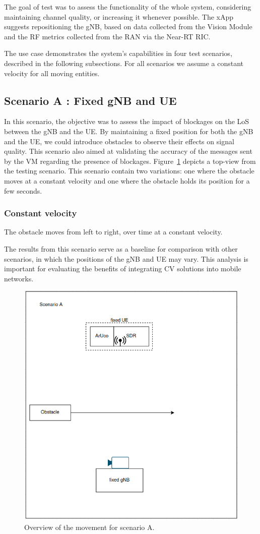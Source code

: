 The goal of test was to assess the functionality of the whole system, considering maintaining channel quality, or increasing it whenever possible.
The xApp suggests repositioning the gNB, based on data collected from the Vision Module and the RF metrics collected from the RAN via the Near-RT RIC\@.

The use case demonstrates the system's capabilities in four test scenarios, described in the following subsections.
For all scenarios we assume a constant velocity for all moving entities.

\subsection{Scenario A : Fixed gNB and UE}\label{subsec:scenario-0-:-fixed-gnb-and-ue}

In this scenario, the objective was to assess the impact of blockages on the LoS between the gNB and the UE\@.
By maintaining a fixed position for both the gNB and the UE, we could introduce obstacles to observe their effects on signal quality.
This scenario also aimed at validating the accuracy of the messages sent by the VM regarding the presence of blockages.
Figure~\ref{fig:test_fixed} depicts a top-view from the testing scenario.
This scenario contain two variations: one where the obstacle moves at a constant velocity and one where the obstacle holds its position for a few seconds.

\subsubsection{Constant velocity}
The obstacle moves from left to right, over time at a constant velocity.

The results from this scenario serve as a baseline for comparison with other scenarios, in which the positions of the gNB and UE may vary.
This analysis is important for evaluating the benefits of integrating CV solutions into mobile networks.

\begin{figure}[H]
    \centering
    \includegraphics[width=0.5\linewidth]{figures/scenario0}
    \caption{Overview of the movement for scenario A.}
    \label{fig:test_fixed}
\end{figure}

